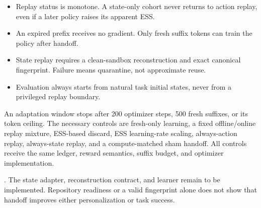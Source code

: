 \begin{itemize}
  \item Replay status is monotone.  A state-only cohort never returns to action
  replay, even if a later policy raises its apparent ESS.
  \item An expired prefix receives no gradient.  Only fresh suffix tokens can
  train the policy after handoff.
  \item State replay requires a clean-sandbox reconstruction and exact
  canonical fingerprint.  Failure means quarantine, not approximate reuse.
  \item Evaluation always starts from natural task initial states, never from a
  privileged replay boundary.
\end{itemize}

An adaptation window stops after 200 optimizer steps, 500 fresh suffixes, or
its token ceiling.  The necessary controls are fresh-only learning, a fixed
offline/online replay mixture, ESS-based discard, ESS learning-rate scaling,
always-action replay, always-state replay, and a compute-matched sham handoff.
All controls receive the same ledger, reward semantics, suffix budget, and
optimizer implementation.

\Evidence.  The state adapter, reconstruction contract, and learner remain to
be implemented.  Repository readiness or a valid fingerprint alone does not
show that handoff improves either personalization or task success.
